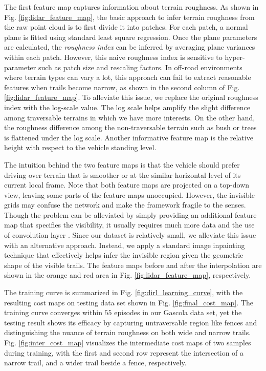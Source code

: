 \documentclass[../thesis.tex]{subfiles}
\begin{document}
The first feature map captures information about terrain roughness.
As shown in Fig. \ref{fig:lidar_feature_map}, the basic approach to infer terrain roughness from the raw point cloud is to first divide it into patches.
For each patch, a normal plane is fitted using standard least square regression.
Once the plane parameters are calculated, the \textit{roughness index} can be inferred by averaging plane variances within each patch.
However, this naive roughness index is sensitive to hyper-parameter such as patch size and rescaling factors.
In off-road environments where terrain types can vary a lot, this approach can fail to extract reasonable features when trails become narrow, as shown in the second column of Fig. \ref{fig:lidar_feature_map}.
To alleviate this issue, we replace the original roughness index with the log-scale value.
The log scale helps amplify the slight difference among traversable terrains in which we have more interests.
On the other hand, the roughness difference among the non-traversable terrain such as bush or trees is flattened under the log scale.
Another informative feature map is the relative height with respect to the vehicle standing level.
 
 
The intuition behind the two feature maps is that the vehicle should prefer driving over terrain that is smoother or at the similar horizontal level of its current local frame.
Note that both feature maps are projected on a top-down view, leaving some parts of the feature maps unoccupied.
However, the invisible grids may confuse the network and make the framework fragile to the senses.
Though the problem can be alleviated by simply providing an additional feature map that specifies the visibility, it usually requires much more data and the use of convolution layer \cite{wulfmeier2015maximum,wulfmeier2016watch}.
Since our dataset is relatively small, we alleviate this issue with an alternative approach.
Instead, we apply a standard image inpainting technique \cite{telea2004image} that effectively helps infer the invisible region given the geometric shape of the visible trails.
The feature maps before and after the interpolation are shown in the orange and red area in Fig. \ref{fig:lidar_feature_map}, respectively.
 
The training curve is summarized in Fig. \ref{fig:dirl_learning_curve}, with the resulting cost maps on testing data set shown in Fig. \ref{fig:final_cost_map}. 
The training curve converges within $55$ episodes in our Gascola data set, yet the testing result shows its efficacy by capturing untraversable region like fences and distinguishing the nuance of terrain roughness on both wide and narrow trails.
Fig. \ref{fig:inter_cost_map} visualizes the intermediate cost maps of two samples during training, with the first and second row represent the intersection of a narrow trail, and a wider trail beside a fence, respectively.
\end{document}
